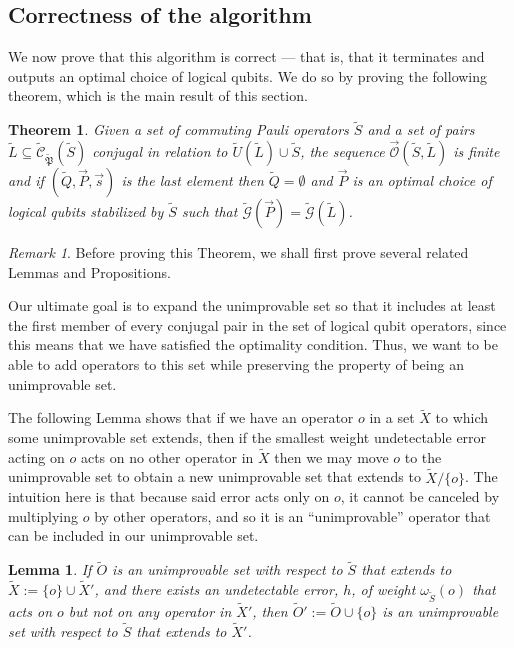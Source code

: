 \documentclass{amsbook}
\theoremstyle{plain}
\newtheorem{theorem}{Theorem}
\newtheorem{lemma}{Lemma}
\theoremstyle{definition}
\theoremstyle{remark}
\newtheorem{remark}{Remark}
\newcommand{\lst}{\vec}
\newcommand{\set}{\tilde}
\newcommand{\genfun}{\tilde{\mathcal{G}}}
\newcommand{\pauligroup}{{\set{\mathfrak{P}}}}
\newcommand{\centralizer}{\set{\mathcal{C}}}
\newcommand{\optimizer}{\lst{\mathcal{O}}}
\newcommand{\om}{\omega}
\begin{document}
\subsection{Correctness of the algorithm}

We now prove that this algorithm is correct --- that is, that it terminates and outputs an optimal choice of logical qubits.  We do so by proving the following theorem, which is the main result of this section.

\begin{theorem}
\label{theorem:algorithm is correct}
Given a set of commuting Pauli operators $\set S$ and a set of pairs $\set L\subseteq\centralizer_\pauligroup(\set S)$ conjugal in relation to $\set U(\set L)\cup\set S$, the sequence $\optimizer(\set S,\set L)$ is finite and if $(\set Q,\lst P,\lst s)$ is the last element then $\set Q=\emptyset$ and $\lst P$ is an optimal choice of logical qubits stabilized by $\set S$ such that $\genfun(\lst P)=\genfun(\set L)$.
\end{theorem}
\begin{remark}
Before proving this Theorem, we shall first prove several related Lemmas and Propositions.

Our ultimate goal is to expand the unimprovable set so that it includes at least the first member of every conjugal pair in the set of logical qubit operators, since this means that we have satisfied the optimality condition.  Thus, we want to be able to add operators to this set while preserving the property of being an unimprovable set.

The following Lemma shows that if we have an operator $o$ in a set $\set X$ to which some unimprovable set extends, then if the smallest weight undetectable error acting on $o$ acts on no other operator in $\set X$ then we may move $o$ to the unimprovable set to obtain a new unimprovable set that extends to $\set X\slash \{o\}$.  The intuition here is that because said error acts only on $o$, it cannot be canceled by multiplying $o$ by other operators, and so it is an ``unimprovable'' operator that can be included in our unimprovable set.
\end{remark}

\begin{lemma}
\label{lemma:move-it-over}
If $\set O$ is an unimprovable set with respect to $\set S$ that extends to $\set X:=\{o\}\cup\set X'$, and there exists an undetectable error, $h$, of weight $\om_{\set S}(o)$ that acts on $o$ but not on any operator in $\set X'$, then $\set O':=\set O\cup\{o\}$ is an unimprovable set with respect to $\set S$ that extends to $\set X'$.
\end{lemma}
\end{document}
